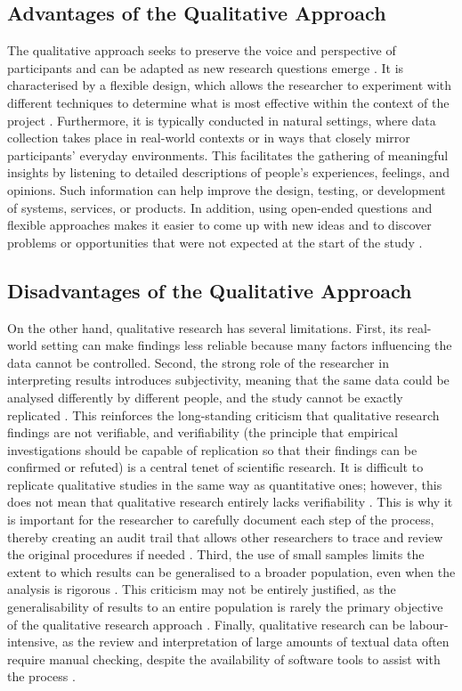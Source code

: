\documentclass[a4paper, 12pt, twoside]{report}  %
\begin{document}
\subsection{Advantages of the Qualitative Approach}

\indent The qualitative approach seeks to preserve the voice and perspective of participants and can be adapted as new research questions emerge \cite{scribbr}. It is characterised by a flexible design, which allows the researcher to experiment with different techniques to determine what is most effective within the context of the project \cite{gilmore}. Furthermore, it is typically conducted in natural settings, where data collection takes place in real-world contexts or in ways that closely mirror participants’ everyday environments. This facilitates the gathering of meaningful insights by listening to detailed descriptions of people’s experiences, feelings, and opinions. Such information can help improve the design, testing, or development of systems, services, or products. In addition, using open-ended questions and flexible approaches makes it easier to come up with new ideas and to discover problems or opportunities that were not expected at the start of the study \cite{scribbr}.

\subsection{Disadvantages of the Qualitative Approach}

\indent On the other hand, qualitative research has several limitations. First, its real-world setting can make findings less reliable because many factors influencing the data cannot be controlled. Second, the strong role of the researcher in interpreting results introduces subjectivity, meaning that the same data could be analysed differently by different people, and the study cannot be exactly replicated \cite{scribbr}. This reinforces the long-standing criticism that qualitative research findings are not verifiable, and verifiability (the principle that empirical investigations should be capable of replication so that their findings can be confirmed or refuted) is a central tenet of scientific research. It is difficult to replicate qualitative studies in the same way as quantitative ones; however, this does not mean that qualitative research entirely lacks verifiability \cite{allan}. This is why it is important for the researcher to carefully document each step of the process, thereby creating an audit trail that allows other researchers to trace and review the original procedures if needed \cite{lincoln}. Third, the use of small samples limits the extent to which results can be generalised to a broader population, even when the analysis is rigorous \cite{scribbr}. This criticism may not be entirely justified, as the generalisability of results to an entire population is rarely the primary objective of the qualitative research approach \cite{deruyter}. Finally, qualitative research can be labour-intensive, as the review and interpretation of large amounts of textual data often require manual checking, despite the availability of software tools to assist with the process \cite{scribbr}.
\end{document}
